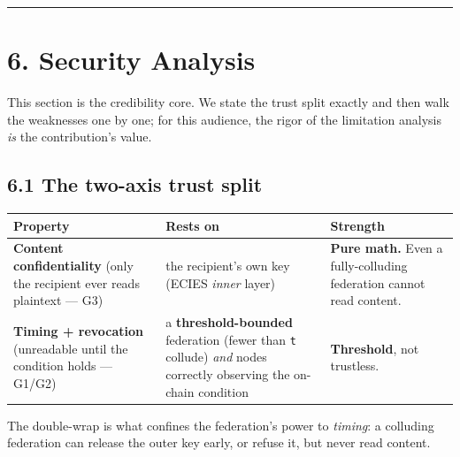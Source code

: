 \documentclass[
  11pt,
]{article}
\begin{document}
\begin{center}\rule{0.5\linewidth}{0.5pt}\end{center}

\section{6. Security Analysis}\label{security-analysis}

This section is the credibility core. We state the trust split exactly
and then walk the weaknesses one by one; for this audience, the rigor of
the limitation analysis \emph{is} the contribution's value.

\subsection{6.1 The two-axis trust
split}\label{the-two-axis-trust-split}

\begin{longtable}[]{@{}
  >{\raggedright\arraybackslash}p{}
  >{\raggedright\arraybackslash}p{}
  >{\raggedright\arraybackslash}p{}@{}}
\toprule\noalign{}
\begin{minipage}[b]{\linewidth}\raggedright
Property
\end{minipage} & \begin{minipage}[b]{\linewidth}\raggedright
Rests on
\end{minipage} & \begin{minipage}[b]{\linewidth}\raggedright
Strength
\end{minipage} \\
\midrule\noalign{}
\endhead
\bottomrule\noalign{}
\endlastfoot
\textbf{Content confidentiality} (only the recipient ever reads
plaintext --- G3) & the recipient's own key (ECIES \emph{inner} layer) &
\textbf{Pure math.} Even a fully-colluding federation cannot read
content. \\
\textbf{Timing + revocation} (unreadable until the condition holds ---
G1/G2) & a \textbf{threshold-bounded} federation (fewer than \texttt{t}
collude) \emph{and} nodes correctly observing the on-chain condition &
\textbf{Threshold}, not trustless. \\
\end{longtable}

The double-wrap is what confines the federation's power to
\emph{timing}: a colluding federation can release the outer key early,
or refuse it, but never read content.
\end{document}

